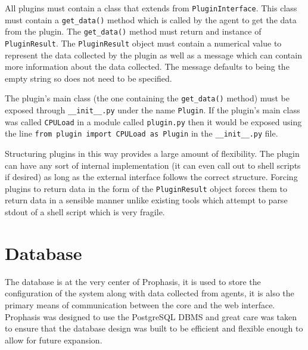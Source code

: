 \documentclass[bsc,logo,twoside,parskip,singlespacing,notimes]{infthesis}
\begin{document}
	All plugins must contain a class that extends from \texttt{PluginInterface}.
	This class must contain a \texttt{get\_data()} method which is called by the
	agent to get the data from the plugin.  The \texttt{get\_data()} method must
	return and instance of \texttt{PluginResult}.  The \texttt{PluginResult} object
	must contain a numerical value to represent the data collected by the plugin as
	well as a message which can contain more information about the data collected.
	The message defaults to being the empty string so does not need to be
	specified.


	The plugin's main class (the one containing the \texttt{get\_data()} method)
	must be exposed through \texttt{\_\_init\_\_.py} under the name \texttt{Plugin}.
	If the plugin's main class was called \texttt{CPULoad} in a module called
	\texttt{plugin.py} then it would be exposed using the line
	\texttt{from plugin import CPULoad as Plugin} in the \texttt{\_\_init\_\_.py}
	file.


	Structuring plugins in this way provides a large amount of flexibility.  The
	plugin can have any sort of internal implementation (it can even call out to
	shell scripts if desired) as long as the external interface follows the correct
	structure.  Forcing plugins to return data in the form of the
	\texttt{PluginResult} object forces them to return data in a sensible manner
	unlike existing tools which attempt to parse stdout of a shell script which is
	very fragile.

\section{Database}

	The database is at the very center of Prophasis, it is used to store the
	configuration of the system along with data collected from agents, it is also
	the primary means of communication between the core and the web interface.
	Prophasis was designed to use the PostgreSQL DBMS and great care was taken to
	ensure that the database design was built to be efficient and flexible enough
	to allow for future expansion.
\end{document}
